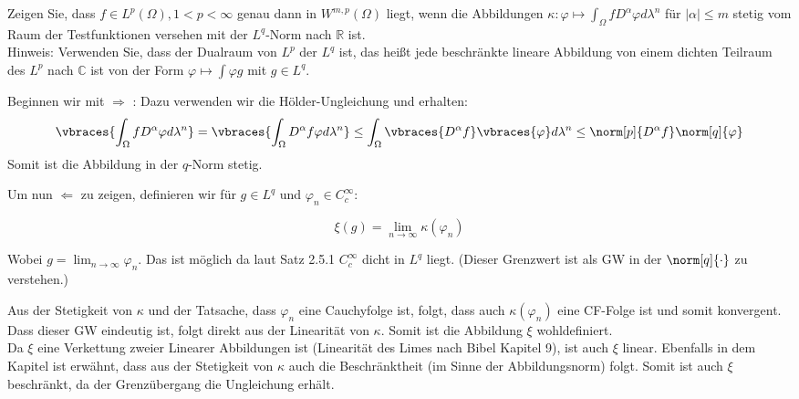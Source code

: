 \begin{exercise}

Zeigen Sie, dass $f \in L^p(\Omega), 1 < p < \infty$ genau dann in $W^{m,p}(\Omega)$ liegt, wenn die Abbildungen $\kappa: \varphi \mapsto \int_{\Omega}fD^{\alpha}\varphi d\lambda^n$ für $|\alpha| \leq m$ stetig vom Raum der Testfunktionen versehen mit der $L^q$-Norm nach $\mathbb{R}$ ist. \\

Hinweis: Verwenden Sie, dass der Dualraum von $L^p$ der $L^q$ ist, das heißt jede beschränkte lineare Abbildung von einem dichten Teilraum des $L^p$ nach $\mathbb{C}$ ist von der Form $\varphi \mapsto \int \varphi g$ mit $g \in L^q$.

\end{exercise}

\begin{solution}

Beginnen wir mit $\Rightarrow$ : Dazu verwenden wir die Hölder-Ungleichung
und erhalten:
\begin{equation*}
  \vbraces{\int_{\Omega}fD^{\alpha}\varphi d\lambda^n} =
  \vbraces{\int_{\Omega}D^{\alpha}f\varphi d\lambda^n} \leq
  \int_{\Omega}\vbraces{D^{\alpha}f}\vbraces{\varphi}d\lambda^n \leq
  \norm[p]{D^{\alpha}f}\norm[q]{\varphi}
\end{equation*}
Somit ist die Abbildung in der $q$-Norm stetig.

Um nun $\Leftarrow$ zu zeigen, definieren wir für $g\in L^q$ und
$\varphi_n \in C^{\infty}_c$:

\begin{equation*}
  \xi(g)=\lim_{n\to\infty}\kappa(\varphi_n)
\end{equation*}

Wobei $g =\lim_{n\to\infty}\varphi_n$. Das ist möglich da laut Satz 2.5.1
$C^{\infty}_c$ dicht in $L^q$ liegt. (Dieser Grenzwert ist als GW in der
$\norm[q]{\cdot}$ zu verstehen.)

Aus der Stetigkeit von $\kappa$ und der Tatsache, dass $\varphi_n$ eine
Cauchyfolge ist, folgt, dass auch $\kappa(\varphi_n)$ eine CF-Folge ist und somit
konvergent. Dass dieser GW eindeutig ist, folgt direkt aus der Linearität von
$\kappa$. Somit ist die Abbildung $\xi$ wohldefiniert. \\

Da $\xi$ eine Verkettung zweier Linearer Abbildungen ist (Linearität des Limes
nach Bibel Kapitel 9), ist auch $\xi$ linear. Ebenfalls in dem Kapitel ist
erwähnt, dass aus der Stetigkeit von $\kappa$ auch die Beschränktheit
(im Sinne der Abbildungsnorm) folgt.
Somit ist auch $\xi$ beschränkt, da der Grenzübergang die Ungleichung erhält. \\


\end{solution}
